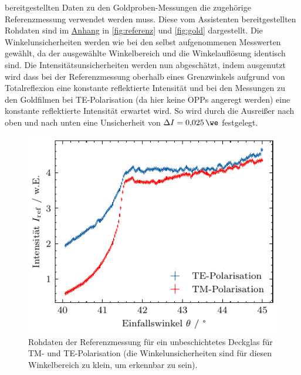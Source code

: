 bereitgestellten Daten zu den Goldproben-Messungen die zugehörige Referenzmessung verwendet werden muss. Diese vom Assistenten bereitgestellten Rohdaten sind im \hyperref[sec:anhang]{Anhang} in \cref{fig:referenz} und \cref{fig:gold} dargestellt.
Die Winkelunsicherheiten werden wie bei den selbst aufgenommenen Messwerten gewählt, da der ausgewählte Winkelbereich und die Winkelauflösung identisch sind. Die Intensitätsunsicherheiten
werden nun abgeschätzt, indem ausgenutzt wird dass bei der Referenzmessung oberhalb eines Grenzwinkels aufgrund von Totalreflexion eine konstante reflektierte Intensität und
bei den Messungen zu den Goldfilmen bei TE-Polarisation (da hier keine OPPs angeregt werden) eine konstante reflektierte Intensität erwartet wird. So wird durch die Ausreißer nach oben und nach unten eine
Unsicherheit von $\Delta I = \SI{0,025}{\we}$ festgelegt.
\begin{figure}[H]
	\centering
	\includegraphics[width=0.4\linewidth]{../figs/referenz_own.pdf}
	\caption{Rohdaten der Referenzmessung für ein unbeschichtetes Deckglas für TM- und TE-Polarisation (die Winkelunsicherheiten sind für diesen Winkelbereich zu klein, um erkennbar zu sein).}
	\label{fig:referenz_own}
\end{figure}
